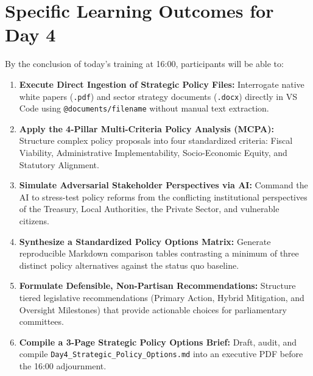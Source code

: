 \documentclass[11pt, a4paper]{report}
\begin{document}
\section{Specific Learning Outcomes for Day 4}
By the conclusion of today's training at 16:00, participants will be able to:
\begin{enumerate}[label=\textbf{4.\arabic*}]
    \item \textbf{Execute Direct Ingestion of Strategic Policy Files:} Interrogate native white papers (\texttt{.pdf}) and sector strategy documents (\texttt{.docx}) directly in VS Code using \texttt{@documents/filename} without manual text extraction.
    \item \textbf{Apply the 4-Pillar Multi-Criteria Policy Analysis (MCPA):} Structure complex policy proposals into four standardized criteria: Fiscal Viability, Administrative Implementability, Socio-Economic Equity, and Statutory Alignment.
    \item \textbf{Simulate Adversarial Stakeholder Perspectives via AI:} Command the AI to stress-test policy reforms from the conflicting institutional perspectives of the Treasury, Local Authorities, the Private Sector, and vulnerable citizens.
    \item \textbf{Synthesize a Standardized Policy Options Matrix:} Generate reproducible Markdown comparison tables contrasting a minimum of three distinct policy alternatives against the status quo baseline.
    \item \textbf{Formulate Defensible, Non-Partisan Recommendations:} Structure tiered legislative recommendations (Primary Action, Hybrid Mitigation, and Oversight Milestones) that provide actionable choices for parliamentary committees.
    \item \textbf{Compile a 3-Page Strategic Policy Options Brief:} Draft, audit, and compile \texttt{Day4\_Strategic\_Policy\_Options.md} into an executive PDF before the 16:00 adjournment.
\end{enumerate}
\end{document}
